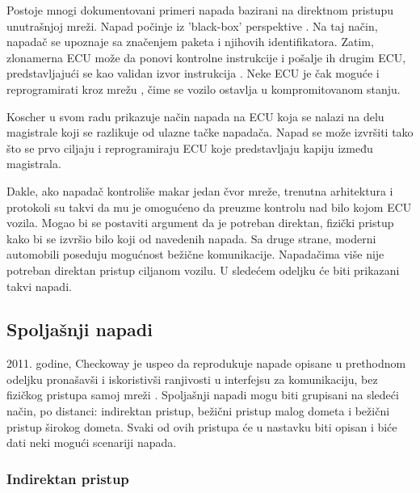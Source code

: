 \documentclass[a4paper]{article}
\begin{document}
  Postoje mnogi dokumentovani primeri napada bazirani na direktnom pristupu unutrašnjoj mreži. Napad počinje iz 'black-box' perspektive \cite{security2}. Na taj način, napadač se upoznaje sa značenjem paketa i njihovih identifikatora. Zatim, zlonamerna ECU može da ponovi kontrolne instrukcije i pošalje ih drugim ECU, predstavljajući se kao validan izvor instrukcija \cite{security3}. Neke ECU je čak moguće i reprogramirati kroz mrežu \cite{5504804}, čime se vozilo ostavlja u kompromitovanom stanju.
  
  Koscher u svom radu \cite{5504804} prikazuje način napada na ECU koja se nalazi na delu magistrale koji se razlikuje od ulazne tačke napadača. Napad se može izvršiti tako što se prvo ciljaju i reprogramiraju ECU koje predstavljaju kapiju između magistrala. %
  
  Dakle, ako napadač kontroliše makar jedan čvor mreže, trenutna arhitektura i protokoli su takvi da mu je omogućeno da preuzme kontrolu nad bilo kojom ECU vozila. Mogao bi se postaviti argument da je potreban direktan, fizički pristup kako bi se izvršio bilo koji od navedenih napada. Sa druge strane, moderni automobili poseduju mogućnost bežične komunikacije. Napadačima više nije potreban direktan pristup ciljanom vozilu. U sledećem odeljku će biti prikazani takvi napadi.

\subsection{Spoljašnji napadi}
\label{subsec:napadispolja}

2011. godine, Checkoway je uspeo da reprodukuje napade opisane u prethodnom odeljku pronašavši i iskoristivši ranjivosti u interfejsu za komunikaciju, bez fizičkog pristupa samoj mreži \cite{5504804}. Spoljašnji napadi mogu biti grupisani na sledeći način, po distanci: indirektan pristup, bežični pristup malog dometa i bežični pristup širokog dometa. Svaki od ovih pristupa će u nastavku biti opisan i biće dati neki mogući scenariji napada.

\subsubsection{Indirektan pristup}  
\label{subsubsec:napadiindirekt}
\end{document}
